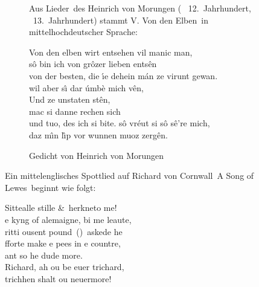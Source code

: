 \documentclass[a4paper, 12pt]{article} %
\begin{document}
\begin{figure}[b]
Aus \flqq Lieder\frqq\ des Heinrich von Morungen (\textasteriskcentered 
~12.~Jahrhundert, \textdagger ~13.~Jahrhundert) stammt \flqq V. Von den Elben\frqq\
in mittelhochdeutscher Sprache:\par\medskip\noindent
\glqq Von den elben wirt entsehen vil manic man,\\
\hspace*{2ex} s\^{o} bin ich von gr\^{o}zer lieben ents\^{e}n \\
von der besten, die \'{\i}e dehein m\'{a}n ze virunt gewan.\\
\hspace*{2ex} wil aber s\^{\i} dar \'{u}mb\`{e} mich v\^{e}n,\\
\hspace*{2ex} Und ze unstaten st\^{e}n,\\
\hspace*{4ex} mac si danne rechen sich\\
\hspace*{4ex} und tuo, des ich si bite. s\^{o} vr\'{e}ut si
s\^{o} s\^{e}\textquoteright re mich,\\
\hspace*{2ex} daz m\^{\i}n l\^{\i}p vor wunnen muoz zerg\^{e}n.\grqq\par\bigskip
\caption{Gedicht von Heinrich von Morungen}\label{Heinrich-Gedicht}
\end{figure}


Ein mittelenglisches \frq Spottlied auf Richard von Cornwall\flq\ 
\textbraceleft A Song of Lewes\textbraceright\
beginnt wie folgt:\par\medskip\noindent
\glqq Sitte\th alle stille \&\ herkne\th to me!\\
\th e kyng of alemaigne, bi me leaute,\\
\th ritti \th ousent pound~(\textsterling)~askede he\\
fforte make \th e pees in \th e countre,\\
\hspace*{4ex} ant so he dude more.\\
\hspace*{2ex} Richard, \th ah \th ou be euer trichard,\\
\hspace*{4ex} trichhen shalt \th ou neuermore!\grqq
\end{document}
